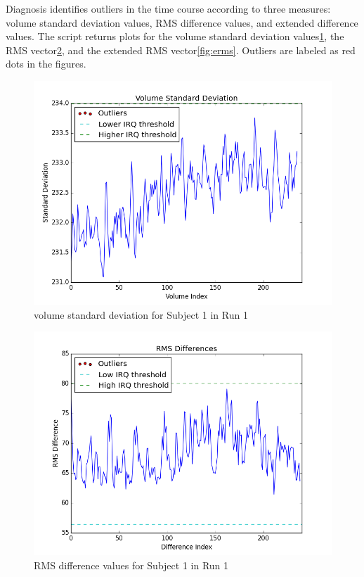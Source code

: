 \par \indent Diagnosis identifies outliers in the time course according to
three measures: volume standard deviation values, RMS difference values, and
extended difference values. The script returns plots for the volume standard
deviation values\ref{fig:vol_std}, the RMS vector\ref{fig:rms}, and the
extended RMS vector\ref{fig:erms}. Outliers are labeled as red dots in the
figures.

\begin{figure}[h!]
\centering
\includegraphics[width=120mm]{images/vol_std.png}
\caption{volume standard deviation for Subject 1 in Run 1}
\label{fig:vol_std}
\end{figure}

\begin{figure}[h!]
\centering
\includegraphics[width=120mm]{images/vol_rms_outliers.png}
\caption{RMS difference values for Subject 1 in Run 1}
\label{fig:rms}
\end{figure}

